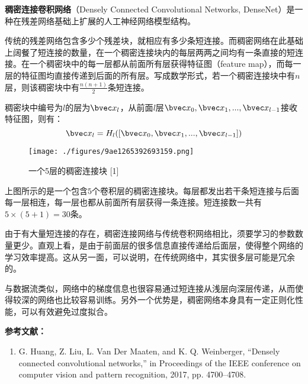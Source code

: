 
\textbf{稠密连接卷积网络}（Densely Connected Convolutional Networks, DenseNet）是一种在残差网络基础上扩展的人工神经网络模型结构。

传统的残差网络包含多少个残差块，就相应有多少条短连接。而稠密网络在此基础上阔餐了短连接的数量，在一个稠密连接块内的每层两两之间均有一条直接的短连接。在一个稠密块中的每一层都从前面所有层获得特征图（feature map），而每一层的特征图均直接传递到后面的所有层。写成数学形式，若一个稠密连接块中有$n$层，则该稠密块中有$\frac{n(n+1)}{2}$条短连接。

稠密块中编号为$l$的层为$\bvec x_l$，从前面$l$层$\bvec x_0, \bvec x_1, ..., \bvec x_{l-1}$接收特征图，则有：
\begin{equation}
\bvec x_l=H_l([\bvec x_0, \bvec x_1, ..., \bvec x_{l-1}])
\end{equation}

\begin{figure}[ht]
\centering
\texttt{[image: ./figures/9ae1265392693159.png]}
\caption{一个5层的稠密连接块 [1]} \label{fig_DensNe}
\end{figure}
上图所示的是一个包含$5$个卷积层的稠密连接块。每层都发出若干条短连接与后面每一层相连，每一层也都从前面所有层获得一条连接。短连接数一共有$5\times(5+1)=30$条。

由于有大量短连接的存在，稠密连接网络与传统卷积网络相比，须要学习的参数数量更少。直观上看，是由于前面层的很多信息直接传递给后面层，使得整个网络的学习效率提高。这从另一面，可以说明，在传统网络中，其实很多层可能是冗余的。

与数据流类似，网络中的梯度信息也很容易通过短连接从浅层向深层传递，从而使得较深的网络也比较容易训练。另外一个优势是，稠密网络本身具有一定正则化性能，可以有效避免过度拟合。


\textbf{参考文献：}
\begin{enumerate}
\item G. Huang, Z. Liu, L. Van Der Maaten, and K. Q. Weinberger, “Densely connected convolutional networks,” in Proceedings of the IEEE conference on computer vision and pattern recognition, 2017, pp. 4700–4708.
\end{enumerate}